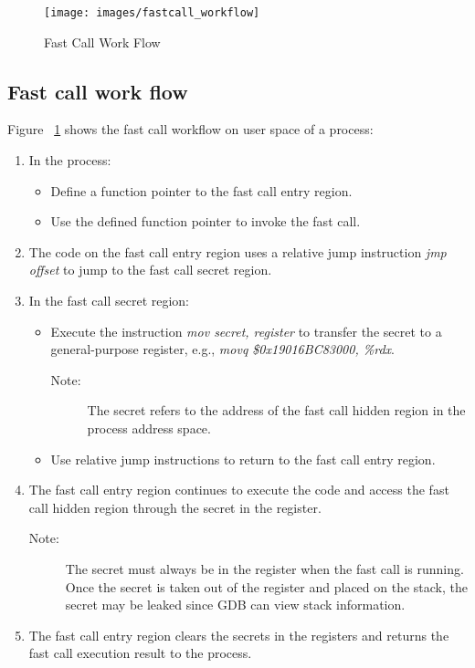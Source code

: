 \begin{figure}[tbp]
  \centering
  \texttt{[image: images/fastcall\_workflow]}
  \caption[Short description]{Fast Call Work Flow}
  \label{fig:fastcall_workflow}
\end{figure}
\subsection{Fast call work flow}
Figure ~\ref{fig:fastcall_workflow} shows the fast call workflow on user space of a process:
\begin{enumerate}
  \item In the process:
    \begin{itemize}
      \item Define a function pointer to the fast call entry region.
      \item Use the defined function pointer to invoke the fast call.
    \end{itemize}
  \item The code on the fast call entry region uses a relative jump instruction \emph{jmp offset} to jump to the fast call secret region.
  \item In the fast call secret region:  
    \begin{itemize}
      \item Execute the instruction \emph{mov secret, register} to transfer the secret to a general-purpose register,  e.g., \emph{movq \$0x19016BC83000, \%rdx}.
        \begin{description}
          \item[Note:] The secret refers to the address of the fast call hidden region in the process address space.
        \end{description}
      \item Use relative jump instructions to return to the fast call entry region.
    \end{itemize}
  \item The fast call entry region continues to execute the code and access the fast call hidden region through the secret in the register.
  \begin{description}
    \item[Note:] The secret must always be in the register when the fast call is running. 
    Once the secret is taken out of the register and placed on the stack, 
    the secret  may be leaked since GDB can view stack information.
  \end{description}
  \item The fast call entry region clears the secrets in the registers and returns the fast call execution result to the process.
\end{enumerate}

